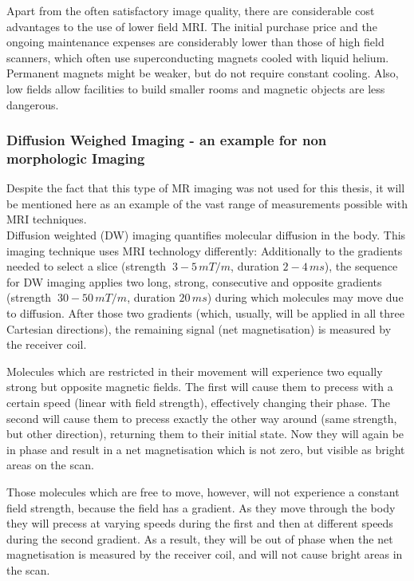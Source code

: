 Apart from the often satisfactory image quality, there are considerable cost advantages to the use of lower field MRI.
The initial purchase price and the ongoing maintenance expenses are considerably lower than those of high field scanners, which often use superconducting magnets cooled with liquid helium. \cite{Rutt1996}
Permanent magnets might be weaker, but do not require constant cooling.
Also, low fields allow facilities to build smaller rooms and magnetic objects are less dangerous.


\subsubsection{Diffusion Weighed Imaging - an example for non morphologic Imaging}

Despite the fact that this type of MR imaging was not used for this thesis, it will be mentioned here as an example of the vast range of measurements possible with MRI techniques.\\

Diffusion weighted (DW) imaging quantifies molecular diffusion in the body.
This imaging technique uses MRI technology differently:
Additionally to the gradients needed to select a slice (strength $~3-5\, mT/m$, duration $2-4\, ms$), the sequence for DW imaging applies two long, strong, consecutive and opposite gradients (strength $~30-50\, mT/m$, duration $20\, ms$) during which molecules may move due to diffusion.
After those two gradients (which, usually, will be applied in all three Cartesian directions), the remaining signal (net magnetisation) is measured by the receiver coil.

Molecules which are restricted in their movement will experience two equally strong but opposite magnetic fields.
The first will cause them to precess with a certain speed (linear with field strength), effectively changing their phase.
The second will cause them to precess exactly the other way around (same strength, but other direction), returning them to their initial state.
Now they will again be in phase and result in a net magnetisation which is not zero, but visible as bright areas on the scan.

Those molecules which are free to move, however, will not experience a constant field strength, because the field has a gradient.
As they move through the body they will precess at varying speeds during the first and then at different speeds during the second gradient.
As a result, they will be out of phase when the net magnetisation is measured by the receiver coil, and will not cause bright areas in the scan.


